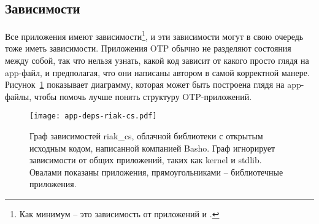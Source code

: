 \documentclass[11pt, oneside]{book}   	%
\begin{document}
\subsection{Зависимости}
\label{subsec:dive-dependencies}

Все приложения имеют зависимости\footnote{Как минимум -- это зависимость от приложений  и .}, и эти зависимости могут в свою очередь тоже иметь зависимости. Приложения OTP обычно не разделяют состояния между собой, так что нельзя узнать, какой код зависит от какого просто глядя на app-файл, и предполагая, что они написаны автором в самой корректной манере. Рисунок~\ref{fig:app-deps} показывает диаграмму, которая может быть построена глядя на app-файлы, чтобы помочь лучше понять структуру OTP-приложений.


\begin{figure}
  \texttt{[image: app-deps-riak-cs.pdf]}%
  \caption{Граф зависимостей riak\_cs, облачной библиотеки с открытым исходным кодом, написанной компанией Basho. Граф игнорирует зависимости от общих приложений, таких как kernel и stdlib. Овалами показаны приложения, прямоугольниками -- библиотечные приложения.}%
   \label{fig:app-deps}
\end{figure}
\end{document}
